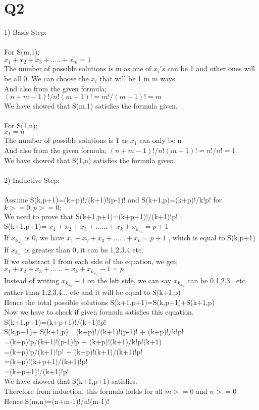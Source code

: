 \documentclass[11pt]{article}
\begin{document}
\section*{Q2}
1) Basis Step:\\\\
For S(m,1);\\
$x_1+x_2+x_3+.....+x_m=1$\\
The number of possible solutions is m as one of
 $x_i's$
 can be 1 and other ones will be all 0. We can choose the 
 $x_i$
 that will be 1 in m ways.\\
 And also from the given formula;
$(n+m-1)!/n!(m-1)!=m!/(m-1)!=m$\\
We have showed that S(m,1) satisfies the formula given. \\\\
For S(1,n);\\
$x_1=n$\\
The number of possible solutions is 1 as
$x_1$
can only be n\\
 And also from the given formula;
$(n+m-1)!/n!(m-1)!=n!/n!=1$\\
We have showed that S(1,n) satisfies the formula given. \\\\
2) Inductive Step:\\\\
Assume S(k,p+1)=(k+p)!/(k+1)!(p-1)!  and S(k+1,p)=(k+p)!/k!p! for 
$k>=0,p>=0;$\\
We need to prove that S(k+1,p+1)=(k+p+1)!/(k+1)!p! ;\\
S(k+1,p+1)=
$x_1+x_2+x_3+......+x_k+x_k_+_1=p+1$\\
If 
$x_k_+_1$
 is 0, we have
$x_1+x_2+x_3+......+x_k=p+1$
, which is equal to S(k,p+1)\\
If 
$x_k_+_1$
is greater than 0, it can be 1,2,3,4 etc.\\
If we substract 1 from each side of the equation, we get;\\
$x_1+x_2+x_3+......+x_k+x_k_+_1-1=p$\\
Instead of writing
$x_k_+_1-1$
on the left side, we can say 
$x_k_+_1$ can be 0,1,2,3.. etc rather than 1,2,3,4... etc
and it will be equal to S(k+1,p)\\
Hence the total possible solutions S(k+1,p+1)=S(k,p+1)+S(k+1,p)\\
Now we have to check if given formula satisfies this equation.\\
S(k+1,p+1)=(k+p+1)!/(k+1)!p!\\
S(k,p+1)+ S(k+1,p)= (k+p)!/(k+1)!(p-1)! + (k+p)!/k!p!\\
 =(k+p)!p/(k+1)!(p-1)!p + (k+p)!(k+1)/k!p!(k+1)\\
 =(k+p)!p/(k+1)!p! + (k+p)!(k+1)/(k+1)!p!\\
 =(k+p)!(k+p+1)/(k+1)!p!\\
 =(k+p+1)!/(k+1)!p!\\
 We have showed that S(k+1,p+1) satisfies.\\
 Therefore from induction, this formula holds for all
 $m>=0$ 
 and
 $n>=0$\\
 Hence S(m,n)=(n+m-1)!/n!(m-1)!
\end{document}
